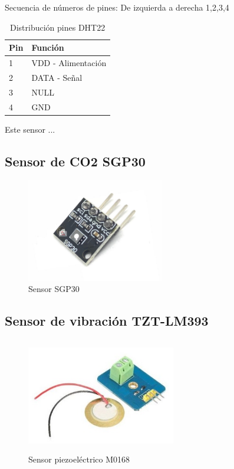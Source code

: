 Secuencia de números de pines: De izquierda a derecha 1,2,3,4

\begin{table}[H]
    \centering
    \caption{Distribución pines DHT22}
    \label{tab:pines_DHT}
    \begin{tabular}{|l|l|}
    \hline
    Pin & Función            \\ \hline
    1   & VDD - Alimentación \\ \hline
    2   & DATA - Señal       \\ \hline
    3   & NULL               \\ \hline
    4   & GND                \\ \hline
    \end{tabular}
\end{table}

Este sensor ...


\subsection{Sensor de CO2 SGP30}

\begin{figure}[H]
      \centering
      \includegraphics[width=6cm, height=4.5cm]{imagenes/sgp30.jpg}
      \caption{Sensor SGP30}
      \label{imag:sgp30}
\end{figure}



\subsection{Sensor de vibración TZT-LM393}

\begin{figure}[H]
      \centering
      \includegraphics[width=6.5cm, height=5cm]{imagenes/sensor-piezoelectrico.jpg}
      \caption{Sensor piezoeléctrico M0168}
      \label{imag:M0168}
   \end{figure}

